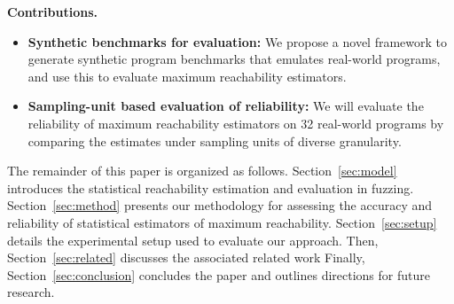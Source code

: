 \documentclass[conference]{IEEEtran}
\begin{document}

\noindent{}\textbf{Contributions.}

\begin{itemize}
  \item \textbf{Synthetic benchmarks for evaluation:} We propose a novel
framework to generate synthetic program benchmarks that emulates real-world
programs, and use this to evaluate maximum reachability estimators.

  \item \textbf{Sampling-unit based evaluation of reliability:} We will evaluate
    the reliability of maximum reachability estimators on 32 real-world programs
    by comparing the estimates under sampling units of diverse granularity.

    

\end{itemize}

The remainder of this paper is organized as follows. Section~\ref{sec:model} introduces the statistical reachability estimation and evaluation in fuzzing. Section~\ref{sec:method} presents our methodology for assessing the accuracy and reliability of statistical estimators of maximum reachability. Section~\ref{sec:setup} details the experimental setup used to evaluate our approach. Then, Section~\ref{sec:related} discusses the associated related work Finally, Section~\ref{sec:conclusion} concludes the paper and outlines directions for future research.

\end{document}
